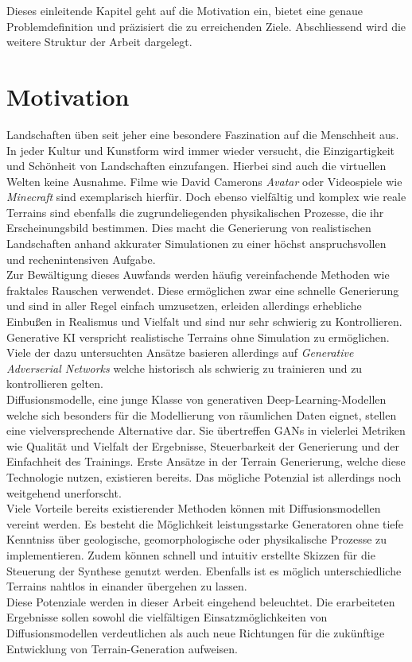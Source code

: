 Dieses einleitende Kapitel geht auf die Motivation ein, bietet eine genaue Problemdefinition und präzisiert die zu erreichenden Ziele. Abschliessend wird die weitere Struktur der Arbeit dargelegt. 


\section{Motivation}

Landschaften üben seit jeher eine besondere Faszination auf die Menschheit aus. In jeder Kultur und Kunstform wird immer wieder versucht, die Einzigartigkeit und Schönheit von Landschaften einzufangen. Hierbei sind auch die virtuellen Welten keine Ausnahme. Filme wie David Camerons \textit{Avatar} oder Videospiele wie \textit{Minecraft} sind exemplarisch hierfür. Doch ebenso vielfältig und komplex wie reale Terrains sind ebenfalls die zugrundeliegenden physikalischen Prozesse, die ihr Erscheinungsbild bestimmen. Dies macht die Generierung von realistischen Landschaften anhand akkurater Simulationen zu einer höchst anspruchsvollen und rechenintensiven Aufgabe. \\
Zur Bewältigung dieses Auwfands werden häufig vereinfachende Methoden wie fraktales Rauschen verwendet. Diese ermöglichen zwar eine schnelle Generierung und sind in aller Regel einfach umzusetzen, erleiden allerdings erhebliche Einbußen in Realismus und Vielfalt und sind nur sehr schwierig zu Kontrollieren. \\
Generative KI verspricht realistische Terrains ohne Simulation zu ermöglichen. Viele der dazu untersuchten Ansätze basieren allerdings auf \textit{Generative Adverserial Networks} welche historisch als schwierig zu trainieren und zu kontrollieren gelten. \\
Diffusionsmodelle, eine junge Klasse von generativen Deep-Learning-Modellen welche sich besonders für die Modellierung von räumlichen Daten eignet, stellen eine vielversprechende Alternative dar. Sie übertreffen GANs in vielerlei Metriken wie Qualität und Vielfalt der Ergebnisse, Steuerbarkeit der Generierung und der Einfachheit des Trainings. Erste Ansätze in der Terrain Generierung, welche diese Technologie nutzen, existieren bereits. Das mögliche Potenzial ist allerdings noch weitgehend unerforscht. \\
Viele Vorteile bereits existierender Methoden können mit Diffusionsmodellen vereint werden. Es besteht die Möglichkeit leistungsstarke Generatoren ohne tiefe Kenntniss über geologische, geomorphologische oder physikalische Prozesse zu implementieren. Zudem können schnell und intuitiv erstellte Skizzen für die Steuerung der Synthese genutzt werden. Ebenfalls ist es möglich unterschiedliche Terrains nahtlos in einander übergehen zu lassen. \\
Diese Potenziale werden in dieser Arbeit eingehend beleuchtet. Die erarbeiteten Ergebnisse sollen sowohl die vielfältigen Einsatzmöglichkeiten von Diffusionsmodellen verdeutlichen als auch neue Richtungen für die zukünftige Entwicklung von Terrain-Generation aufweisen.


